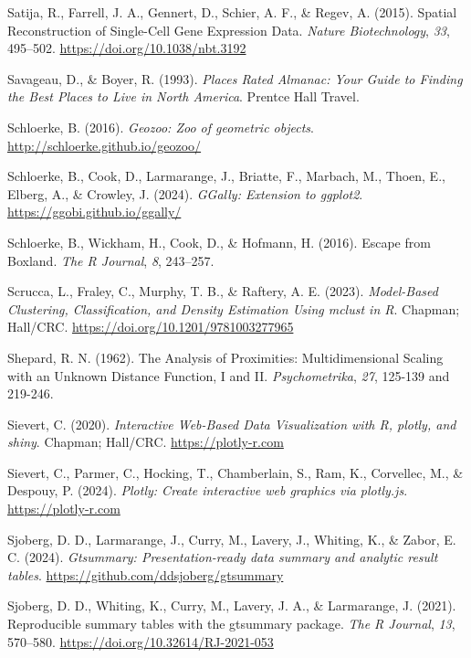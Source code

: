 \documentclass[
  letterpaper,
]{krantz}
\newlength{\cslhangindent}
\newenvironment{CSLReferences}[2] %
 {\begin{list}{}{%
  \setlength{\itemindent}{0pt}
  \setlength{\leftmargin}{0pt}
  \setlength{\parsep}{0pt}
  \ifodd #1
   \setlength{\leftmargin}{\cslhangindent}
   \setlength{\itemindent}{-1\cslhangindent}
  \fi
  \setlength{\itemsep}{#2\baselineskip}}}
 {\end{list}}
\begin{document}
\begin{CSLReferences}{1}{0}
Satija, R., Farrell, J. A., Gennert, D., Schier, A. F., \& Regev, A.
(2015). Spatial {R}econstruction of {S}ingle-{C}ell {G}ene {E}xpression
{D}ata. \emph{Nature Biotechnology}, \emph{33}, 495--502.
\url{https://doi.org/10.1038/nbt.3192}

Savageau, D., \& Boyer, R. (1993). \emph{Places {R}ated {A}lmanac:
{Y}our {G}uide to {F}inding the {B}est {P}laces to {L}ive in {N}orth
{A}merica}. Prentce Hall Travel.

Schloerke, B. (2016). \emph{Geozoo: Zoo of geometric objects}.
\url{http://schloerke.github.io/geozoo/}

Schloerke, B., Cook, D., Larmarange, J., Briatte, F., Marbach, M.,
Thoen, E., Elberg, A., \& Crowley, J. (2024). \emph{GGally: Extension to
ggplot2}. \url{https://ggobi.github.io/ggally/}

Schloerke, B., Wickham, H., Cook, D., \& Hofmann, H. (2016). Escape from
{B}oxland. \emph{The R Journal}, \emph{8}, 243--257.

Scrucca, L., Fraley, C., Murphy, T. B., \& Raftery, A. E. (2023).
\emph{Model-{B}ased {C}lustering, {C}lassification, and {D}ensity
{E}stimation {U}sing {mclust} in {R}}. Chapman; Hall/CRC.
\url{https://doi.org/10.1201/9781003277965}

Shepard, R. N. (1962). The {A}nalysis of {P}roximities:
{M}ultidimensional {S}caling with an {U}nknown {D}istance {F}unction,
{I} and {II}. \emph{Psychometrika}, \emph{27}, 125-139 and 219-246.

Sievert, C. (2020). \emph{Interactive {W}eb-{B}ased {D}ata
{V}isualization with {R}, plotly, and shiny}. Chapman; Hall/CRC.
\url{https://plotly-r.com}

Sievert, C., Parmer, C., Hocking, T., Chamberlain, S., Ram, K.,
Corvellec, M., \& Despouy, P. (2024). \emph{Plotly: Create interactive
web graphics via plotly.js}. \url{https://plotly-r.com}

Sjoberg, D. D., Larmarange, J., Curry, M., Lavery, J., Whiting, K., \&
Zabor, E. C. (2024). \emph{Gtsummary: Presentation-ready data summary
and analytic result tables}.
\url{https://github.com/ddsjoberg/gtsummary}

Sjoberg, D. D., Whiting, K., Curry, M., Lavery, J. A., \& Larmarange, J.
(2021). Reproducible summary tables with the gtsummary package.
\emph{{The R Journal}}, \emph{13}, 570--580.
\url{https://doi.org/10.32614/RJ-2021-053}


\end{CSLReferences}
\end{document}
